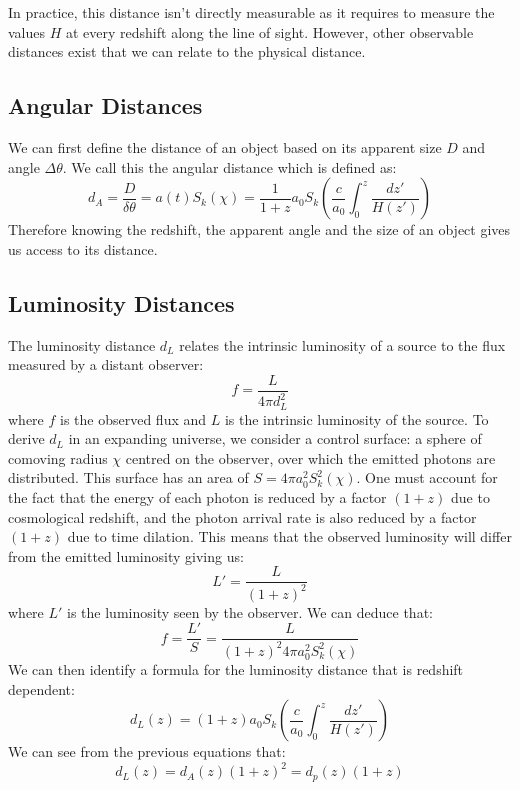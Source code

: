 In practice, this distance isn't directly measurable as it requires to measure the values $H$ at every redshift along the line of sight. However, other observable distances exist 
that we can relate to the physical distance.\\

\subsection{Angular Distances}

We can first define the distance of an object based on its apparent size $D$ and angle $\Delta \theta$. We call this the angular distance which is defined as:
\begin{equation}
    \boxed{d_A = \frac{D}{\delta \theta} = a(t)S_k(\chi) = \frac{1}{1+z} a_0 S_k\left(\frac{c}{a_0} \int_{0}^{z} \frac{dz'}{H(z')}\right)}
\end{equation}
Therefore knowing the redshift, the apparent angle and the size of an object gives us access to its distance.\\

\subsection{Luminosity Distances}

The luminosity distance $d_L$ relates the intrinsic luminosity of a 
source to the flux measured by a distant observer:
\begin{equation}
    f = \frac{L}{4\pi d_L^2}
    \label{eqn:flux_dl}
\end{equation}
where $f$ is the observed flux and $L$ is the intrinsic luminosity of 
the source. To derive $d_L$ in an expanding universe, we consider a 
control surface: a sphere of comoving radius $\chi$ centred on the 
observer, over which the emitted photons are distributed. This 
surface has an area of $S = 4\pi a_0^2 S_k^2(\chi)$. 
One must account for the fact that the energy of each photon is reduced by a factor $(1+z)$ 
due to cosmological redshift, and the photon arrival rate is also 
reduced by a factor $(1+z)$ due to time dilation. 
This means that the observed luminosity will differ from the emitted luminosity giving us:
\begin{equation}
    L' = \frac{L}{(1+z)^2}
\end{equation}
where $L'$ is the luminosity seen by the observer. We can deduce that:
\begin{equation}
    f=\frac{L'}{S} = \frac{L}{(1+z)^2 4\pi a_0^2 S_k^2(\chi) }
\end{equation}
We can then identify a formula for the luminosity distance that is redshift dependent:
\begin{equation}
    \boxed{d_L(z) = (1+z)a_0 S_k\left(\frac{c}{a_0} \int_{0}^{z} \frac{dz'}{H(z')}\right)}
    \label{eqn:distance_luminosity}
\end{equation}
We can see from the previous equations that:
\begin{equation}
    d_L(z) = d_A(z)(1+z)^2 = d_p(z)(1+z)
\end{equation}

